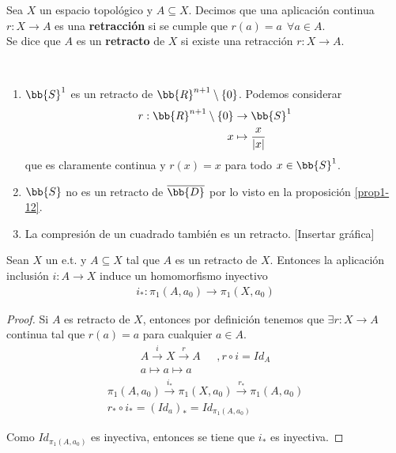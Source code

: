 \begin{definicion}
    Sea $X$ un espacio topológico y $A\subseteq X$. Decimos que una aplicación continua $r:X \to A$ es una \textbf{retracción} si se cumple que $r(a) = a\ \ \forall a \in A$.\\

    Se dice que $A$ es un \textbf{retracto} de $X$ si existe una retracción $r:X \to A$.
\end{definicion}

\begin{ejemplo}\
    \begin{enumerate}
        \item $\bb{S}^1$ es un retracto de $\bb{R}^{n+1}\setminus \{0\}$. Podemos considerar
        \begin{align*}
            r:\bb{R}^{n+1}\setminus \{0\} &\to \bb{S}^1\\
            x & \mapsto \frac{x}{|x|}
        \end{align*}
        que es claramente continua y $r(x) = x$ para todo $x\in \bb{S}^1$.

        \item $\bb{S}$ no es un retracto de $\overline{\bb{D}}$ por lo visto en la proposición \ref{prop1-12}.
        
        \item La compresión de un cuadrado también es un retracto. [Insertar gráfica]
    \end{enumerate}
\end{ejemplo}

\begin{lema}
    Sean $X$ un e.t. y $A\subseteq X$ tal que $A$ es un retracto de $X$. Entonces la aplicación inclusión $i:A\to X$ induce un homomorfismo inyectivo
    \begin{gather*}
        i_* : \pi_1(A, a_0) \to \pi_1(X,a_0)
    \end{gather*}

    \begin{proof}
        Si $A$ es retracto de $X$, entonces por definición tenemos que  $\exists r :X \to A$ continua tal que $r(a)=a$ para cualquier $a\in A$.
        \begin{align*}
            A \overset{i}{\longrightarrow} X \overset{r}{\longrightarrow} A& \ \ \ ,r\circ i = Id_A\\
            a \longmapsto a  \longmapsto a&
        \end{align*}
        \begin{gather*}
            \pi_1(A,a_0) \overset{i_*}{\longrightarrow} \pi_1(X, a_0) \overset{r_*}{\longrightarrow} \pi_1(A,a_0)\\
            r_* \circ i_* = (Id_a)_* = Id_{\pi_1(A,a_0)}
        \end{gather*}
            
        Como $Id_{\pi_1(A,a_0)}$ es inyectiva, entonces se tiene que $i_*$ es inyectiva.
    \end{proof}
\end{lema}

